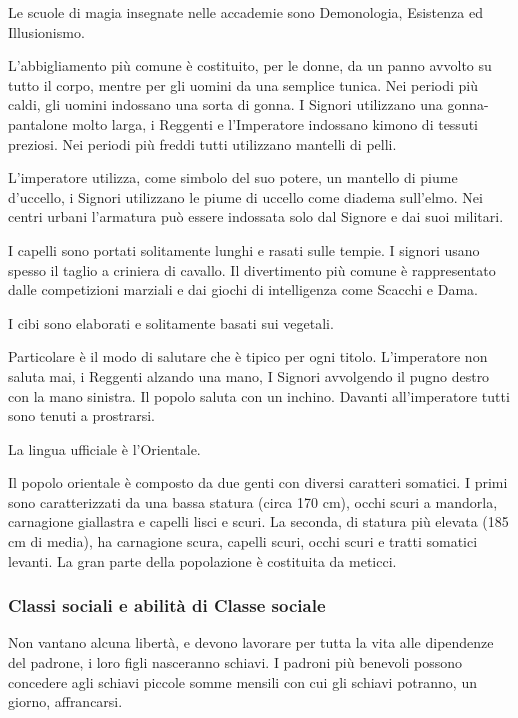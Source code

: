 Le scuole di magia insegnate nelle accademie sono Demonologia,
Esistenza ed Illusionismo.

\Moda L'abbigliamento pi\`u comune \`e costituito, per le donne, da un
panno avvolto su tutto il corpo, mentre per gli uomini da una semplice
tunica. Nei periodi pi\`u caldi, gli uomini indossano una sorta di
gonna. I Signori utilizzano una gonna-pantalone molto larga, i
Reggenti e l'Imperatore indossano kimono di tessuti preziosi. Nei
periodi pi\`u freddi tutti utilizzano mantelli di pelli.

L'imperatore utilizza, come simbolo del suo potere, un mantello di
piume d'uccello, i Signori utilizzano le piume di uccello come diadema
sull'elmo.  Nei centri urbani l'armatura pu\`o essere indossata solo
dal Signore e dai suoi militari.

I capelli sono portati solitamente lunghi e rasati sulle tempie.  I
signori usano spesso il taglio a criniera di cavallo. Il divertimento
pi\`u comune \`e rappresentato dalle competizioni marziali e dai
giochi di intelligenza come Scacchi e Dama.

I cibi sono elaborati e solitamente basati sui vegetali.

Particolare \`e il modo di salutare che \`e tipico per ogni
titolo. L'imperatore non saluta mai, i Reggenti alzando una mano, I
Signori avvolgendo il pugno destro con la mano sinistra. Il popolo
saluta con un inchino. Davanti all'imperatore tutti sono tenuti a
prostrarsi. 

La lingua ufficiale \`e l'Orientale.

\Fisico Il popolo orientale \`e composto da due genti con diversi
caratteri somatici. I primi sono caratterizzati da una bassa statura
(circa 170 cm), occhi scuri a mandorla, carnagione giallastra e
capelli lisci e scuri. La seconda, di statura pi\`u elevata (185 cm di
media), ha carnagione scura, capelli scuri, occhi scuri e tratti
somatici levanti. La gran parte della popolazione \`e costituita da
meticci.

\minmaxumani

\subsubsection{Classi sociali e abilit\`a di Classe sociale}


Non vantano alcuna libert\`a, e devono lavorare per tutta la vita alle
dipendenze del padrone, i loro figli nasceranno schiavi. I padroni
pi\`u benevoli possono concedere agli schiavi piccole somme mensili
con cui gli schiavi potranno, un giorno, affrancarsi.

